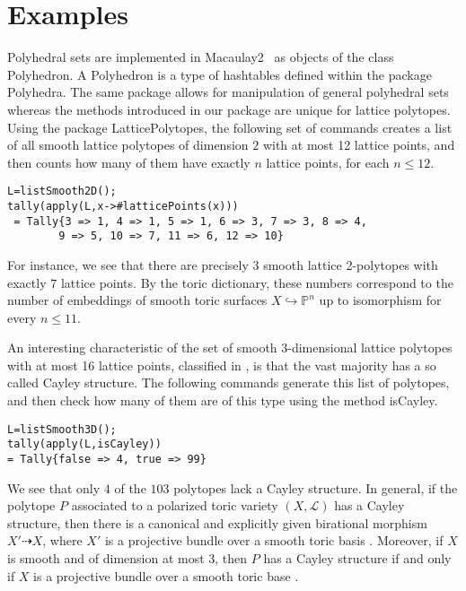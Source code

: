 \documentclass{amsart}
\begin{document}
\section{Examples}
Polyhedral sets are implemented in {\textsf{Macaulay2}\ } as objects of the class \textsf{Polyhedron}.
A \textsf{Polyhedron} is a type of hashtables defined within the package \textsf{Polyhedra}. The same package allows for manipulation of general polyhedral sets whereas the methods introduced in our package are unique for lattice polytopes. Using the package \textsf{LatticePolytopes}, the following set of commands creates a list of all smooth lattice polytopes of dimension $2$ with at most 12 lattice points, and then counts how many of them have exactly $n$ lattice points, for each $n\le 12$. 
\begin{verbatim}
L=listSmooth2D();
tally(apply(L,x->#latticePoints(x)))
 = Tally{3 => 1, 4 => 1, 5 => 1, 6 => 3, 7 => 3, 8 => 4, 
        9 => 5, 10 => 7, 11 => 6, 12 => 10}
\end{verbatim}
For instance, we see that there are precisely $3$ smooth lattice 2-polytopes with exactly $7$ lattice points. By the toric dictionary, these numbers correspond to the number of embeddings of smooth toric surfaces $X\hookrightarrow {\mathbb{P}}^n$ up to isomorphism for every $n\le 11$. 

An interesting characteristic of the set of smooth 3-dimensional lattice polytopes with at most 16 lattice points, classified in \cite{myclass}, is that the vast majority has a so called Cayley structure. The following commands generate this list of polytopes, and then check how many of them are of this type using the method \textsf{isCayley}.
\begin{verbatim}
L=listSmooth3D();
tally(apply(L,isCayley))
= Tally{false => 4, true => 99}
\end{verbatim}
We see that only $4$ of the $103$ polytopes lack a Cayley structure. In general, if the polytope $P$ associated to a polarized toric variety $(X,{\mathscr{L}})$ has a Cayley structure, then there is a canonical and explicitly given birational morphism $X'\dashrightarrow X$, where $X'$ is a projective bundle over a smooth toric basis \cite{SandraLinFib}. Moreover, if $X$ is smooth and of dimension at most $3$, then $P$ has a Cayley structure if and only if $X$ is a projective bundle over a smooth toric base \cite[Proposition ~2]{localpos}.
\end{document}
